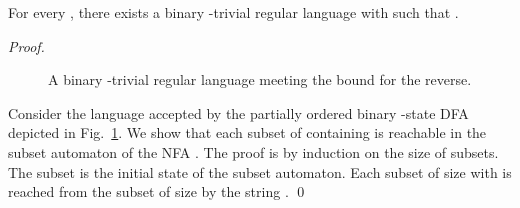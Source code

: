 \documentclass[runningheads]{llncs}
\newcommand{\R}{}
\begin{document}
  \begin{lemma}\label{le:binaryRtriv_lower}
    For every ,
    there exists a binary \R-trivial regular language  with 
    such that .
  \end{lemma}
  \begin{proof}
    \begin{figure}[t]
      \centering
      \caption{A binary \R-trivial regular language meeting the bound  for the reverse.}
      \label{fi:binaryRtriv}
    \end{figure}
    Consider the language 
    accepted by the partially ordered binary \mbox{-state} DFA 
    depicted in Fig.~\ref{fi:binaryRtriv}.
    We show that 
    each subset of  containing 
    is reachable in the subset automaton of the NFA .
    The proof is by induction on the size of subsets.
    The subset  is the initial state of the subset automaton.
    Each subset  of size  
    with 
    is reached from the subset  of size 
    by the string . 
  \qed
  \end{proof}
\end{document}
